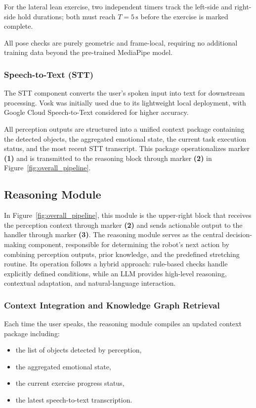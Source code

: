 For the lateral lean exercise, two independent timers track the left-side and right-side hold durations; both must reach $T = 5\,\text{s}$ before the exercise is marked complete.

All pose checks are purely geometric and frame-local, requiring no additional training data beyond the pre-trained MediaPipe model.

\subsubsection{Speech-to-Text (STT)}
The STT component converts the user's spoken input into text for downstream processing. Vosk \cite{ref22} was initially used due to its lightweight local deployment, with Google Cloud Speech-to-Text \cite{ref23} considered for higher accuracy.

All perception outputs are structured into a unified context package containing the detected objects, the aggregated emotional state, the current task execution status, and the most recent STT transcript. This package operationalizes marker \textbf{(1)} and is transmitted to the reasoning block through marker \textbf{(2)} in Figure~\ref{fig:overall_pipeline}.

\subsection{Reasoning Module}

In Figure~\ref{fig:overall_pipeline}, this module is the upper-right block that receives the perception context through marker \textbf{(2)} and sends actionable output to the handler through marker \textbf{(3)}. The reasoning module serves as the central decision-making component, responsible for determining the robot's next action by combining perception outputs, prior knowledge, and the predefined stretching routine. Its operation follows a hybrid approach: rule-based checks handle explicitly defined conditions, while an LLM provides high-level reasoning, contextual adaptation, and natural-language interaction.

\subsubsection{Context Integration and Knowledge Graph Retrieval}

Each time the user speaks, the reasoning module compiles an updated context package including:
\begin{itemize}
\item the list of objects detected by perception,
\item the aggregated emotional state,
\item the current exercise progress status,
\item the latest speech-to-text transcription.
\end{itemize}

